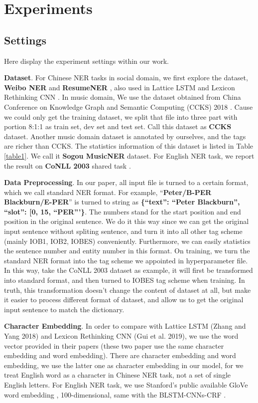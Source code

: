 \documentclass[letterpaper]{article} %
\begin{document}
\section{Experiments}

\subsection{Settings}

Here display the experiment settings within our work.

\textbf{Dataset}. For Chinese NER tasks in social domain, we first explore the dataset, \textbf{Weibo NER} \cite{peng15,hesun16} and \textbf{ResumeNER} \cite{lattice}, also used in Lattice LSTM \cite{lattice} and Lexicon Rethinking CNN \cite{lrcnn}. In music domain, We use the dataset obtained from China Conference on Knowledge Graph and Semantic Computing (CCKS) 2018 \cite{ccks}. Cause we could only get the training dataset,  we split that file into three part with portion 8:1:1 as train set, dev set and test set. Call this dataset as \textbf{CCKS} dataset. Another music domain dataset is annotated by ourselves, and the tags are richer than CCKS. The statistics information of this dataset is listed in Table \ref{table1}. We call it \textbf{Sogou MusicNER} dataset. For English NER task, we report the result on \textbf{CoNLL 2003} shared task \cite{conll}.

\textbf{Data Preprocessing}. In our paper, all input file is turned to a certain format, which we call standard NER format. For example, ``\textbf{Peter/B-PER Blackburn/E-PER}'' is turned to string as \textbf{\{``text'': ``Peter Blackburn'', ``slot'': [0, 15, ``PER'''\}}. The numbers stand for the start position and end position in the original sentence. We do it this way since we can get the original input sentence without spliting sentence, and turn it into all other tag scheme (mainly IOB1, IOB2, IOBES) conveniently. Furthermore, we can easily statistics the sentence number and entity number in this format. On training, we turn the standard NER format into the tag scheme we appointed in hyperparameter file. In this way, take the CoNLL 2003 dataset as example, it will first be transformed into standard format, and then turned to IOBES tag scheme when training. In truth, this transformation doesn't change the content of dataset at all, but make it easier to process different format of dataset, and allow us to get the original input sentence to match the dictionary.

\textbf{Character Embedding}. In order to compare with Lattice LSTM (Zhang and Yang 2018) and Lexicon Rethinking CNN (Gui et al. 2019), we use the word vector provided in their papers (these two paper use the same character embedding and word embedding). There are character embedding and word embedding, we use the latter one as character embedding in our model, for we treat English word as a character in Chinese NER task, not a set of single English letters. For English NER task, we use Stanford's public available GloVe word embedding \cite{glove}, 100-dimensional, same with the BLSTM-CNNs-CRF \cite{mahovy}.
\end{document}
